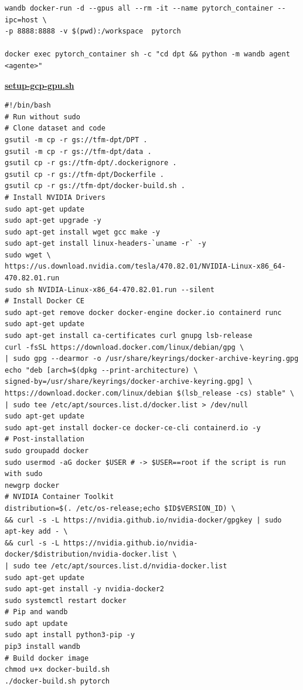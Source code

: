 \begin{verbatim}
wandb docker-run -d --gpus all --rm -it --name pytorch_container --ipc=host \
-p 8888:8888 -v $(pwd):/workspace  pytorch

docker exec pytorch_container sh -c "cd dpt && python -m wandb agent <agente>"
\end{verbatim}

\pagebreak

\underline{\textbf{setup-gcp-gpu.sh}}
\begin{verbatim}
#!/bin/bash
# Run without sudo
# Clone dataset and code
gsutil -m cp -r gs://tfm-dpt/DPT .
gsutil -m cp -r gs://tfm-dpt/data .
gsutil cp -r gs://tfm-dpt/.dockerignore .
gsutil cp -r gs://tfm-dpt/Dockerfile .
gsutil cp -r gs://tfm-dpt/docker-build.sh .
# Install NVIDIA Drivers
sudo apt-get update
sudo apt-get upgrade -y
sudo apt-get install wget gcc make -y
sudo apt-get install linux-headers-`uname -r` -y
sudo wget \
https://us.download.nvidia.com/tesla/470.82.01/NVIDIA-Linux-x86_64-470.82.01.run
sudo sh NVIDIA-Linux-x86_64-470.82.01.run --silent
# Install Docker CE
sudo apt-get remove docker docker-engine docker.io containerd runc
sudo apt-get update
sudo apt-get install ca-certificates curl gnupg lsb-release
curl -fsSL https://download.docker.com/linux/debian/gpg \
| sudo gpg --dearmor -o /usr/share/keyrings/docker-archive-keyring.gpg
echo "deb [arch=$(dpkg --print-architecture) \
signed-by=/usr/share/keyrings/docker-archive-keyring.gpg] \
https://download.docker.com/linux/debian $(lsb_release -cs) stable" \
| sudo tee /etc/apt/sources.list.d/docker.list > /dev/null
sudo apt-get update
sudo apt-get install docker-ce docker-ce-cli containerd.io -y
# Post-installation
sudo groupadd docker
sudo usermod -aG docker $USER # -> $USER==root if the script is run with sudo
newgrp docker
# NVIDIA Container Toolkit
distribution=$(. /etc/os-release;echo $ID$VERSION_ID) \
&& curl -s -L https://nvidia.github.io/nvidia-docker/gpgkey | sudo apt-key add - \
&& curl -s -L https://nvidia.github.io/nvidia-docker/$distribution/nvidia-docker.list \
| sudo tee /etc/apt/sources.list.d/nvidia-docker.list
sudo apt-get update
sudo apt-get install -y nvidia-docker2
sudo systemctl restart docker
# Pip and wandb
sudo apt update
sudo apt install python3-pip -y
pip3 install wandb
# Build docker image
chmod u+x docker-build.sh
./docker-build.sh pytorch
\end{verbatim}
